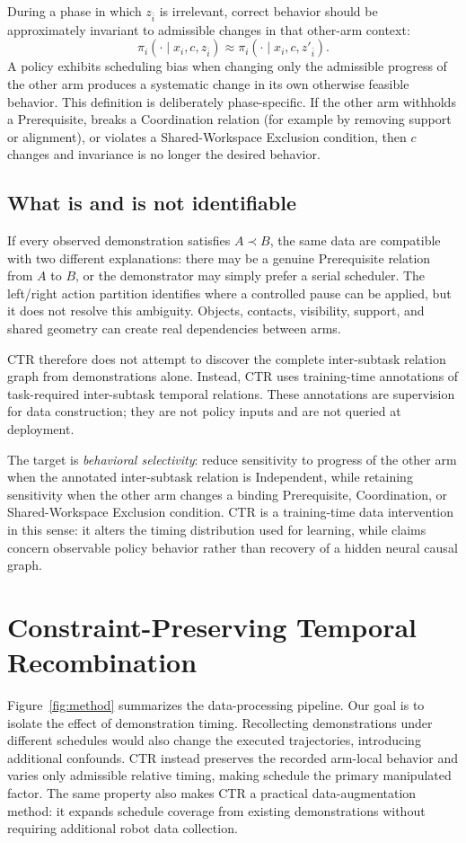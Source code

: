 \documentclass{article}
\newcommand{\method}{CTR}
\begin{document}
During a phase in which $z_{\bar i}$ is irrelevant, correct behavior should be approximately invariant to admissible changes in that other-arm context:
\begin{equation}
 \pi_i(\cdot\mid x_i,c,z_{\bar i})
 \approx
 \pi_i(\cdot\mid x_i,c,z'_{\bar i}).
 \label{eq:invariance}
\end{equation}
A policy exhibits scheduling bias when changing only the admissible progress of the other arm produces a systematic change in its own otherwise feasible behavior. This definition is deliberately phase-specific. If the other arm withholds a Prerequisite, breaks a Coordination relation (for example by removing support or alignment), or violates a Shared-Workspace Exclusion condition, then $c$ changes and invariance is no longer the desired behavior.

\subsection{What is and is not identifiable}
If every observed demonstration satisfies $A\prec B$, the same data are compatible with two different explanations: there may be a genuine Prerequisite relation from $A$ to $B$, or the demonstrator may simply prefer a serial scheduler. The left/right action partition identifies where a controlled pause can be applied, but it does not resolve this ambiguity. Objects, contacts, visibility, support, and shared geometry can create real dependencies between arms.

\method{} therefore does not attempt to discover the complete inter-subtask relation graph from demonstrations alone. Instead, \method{} uses training-time annotations of task-required inter-subtask temporal relations. These annotations are supervision for data construction; they are not policy inputs and are not queried at deployment.

The target is \emph{behavioral selectivity}: reduce sensitivity to progress of the other arm when the annotated inter-subtask relation is Independent, while retaining sensitivity when the other arm changes a binding Prerequisite, Coordination, or Shared-Workspace Exclusion condition. \method{} is a training-time data intervention in this sense: it alters the timing distribution used for learning, while claims concern observable policy behavior rather than recovery of a hidden neural causal graph.

\section{Constraint-Preserving Temporal Recombination}
Figure~\ref{fig:method} summarizes the data-processing pipeline. Our goal is to isolate the effect of demonstration timing. Recollecting demonstrations under different schedules would also change the executed trajectories, introducing additional confounds. CTR instead preserves the recorded arm-local behavior and varies only admissible relative timing, making schedule the primary manipulated factor. The same property also makes CTR a practical data-augmentation method: it expands schedule coverage from existing demonstrations without requiring additional robot data collection.
\end{document}
